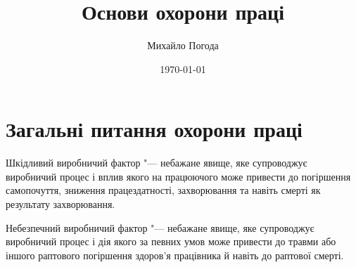 \documentclass[a4paper,10pt,notitlepage,pdftex,headsepline]{scrartcl}
\author{Михайло Погода}
\title{Основи охорони праці}
\date{\today}
\begin{document}
\begin{titlepage}
  \maketitle
\end{titlepage}

\tableofcontents
\newpage

\section{Загальні питання охорони праці}

  Шкідливий виробничий фактор "--- небажане явище, яке супроводжує виробничий
  процес і вплив якого на працюючого може привести до погіршення самопочуття,
  зниження працездатності, захворювання та навіть смерті як результату
  захворювання.

  Небезпечний виробничий фактор "--- небажане явище, яке супроводжує
  виробничий процес і дія якого за певних умов може привести до травми або
  іншого раптового погіршення здоров’я працівника й навіть до раптової смерті.
\end{document}
